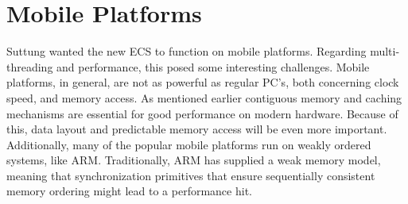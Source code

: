 \section{Mobile Platforms}
\label{sec:requirements_mobile_platforms}
Suttung wanted the new ECS to function on mobile platforms.
Regarding multi-threading and performance, this posed some interesting challenges.
Mobile platforms, in general, are not as powerful as regular PC's, both concerning clock speed, and memory access.
As mentioned earlier contiguous memory and caching mechanisms are essential for good performance on modern hardware.
Because of this, data layout and predictable memory access will be even more important\cite[10:38]{andrei_alexandrescu_quick_code_quickly}.
Additionally, many of the popular mobile platforms run on weakly ordered systems, like ARM\cite{preshing_weak_vs_strong_memory_models}.
Traditionally, ARM has supplied a weak memory model, meaning that synchronization primitives that ensure sequentially consistent memory ordering might lead to a performance hit\cite{herb_sutter_atomic_weapons}.

